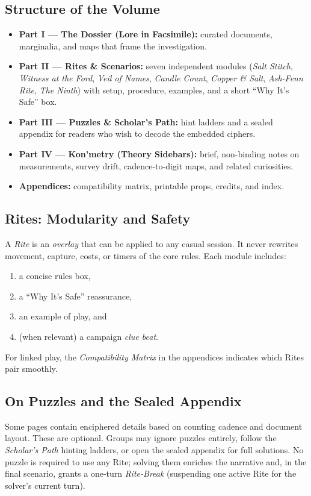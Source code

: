 \documentclass[11pt]{article}
\begin{document}
\subsection*{Structure of the Volume}
\begin{itemize}
  \item \textbf{Part I — The Dossier (Lore in Facsimile):} curated documents, marginalia, and maps that frame the investigation.
  \item \textbf{Part II — Rites \& Scenarios:} seven independent modules (\emph{Salt Stitch}, \emph{Witness at the Ford}, \emph{Veil of Names}, \emph{Candle Count}, \emph{Copper \& Salt}, \emph{Ash-Fenn Rite}, \emph{The Ninth}) with setup, procedure, examples, and a short “Why It’s Safe” box.
  \item \textbf{Part III — Puzzles \& Scholar’s Path:} hint ladders and a sealed appendix for readers who wish to decode the embedded ciphers.
  \item \textbf{Part IV — Kon’metry (Theory Sidebars):} brief, non-binding notes on measurements, survey drift, cadence-to-digit maps, and related curiosities.
  \item \textbf{Appendices:} compatibility matrix, printable props, credits, and index.
\end{itemize}

\subsection*{Rites: Modularity and Safety}
A \emph{Rite} is an \emph{overlay} that can be applied to any casual session. It never rewrites movement, capture, costs, or timers of the core rules. Each module includes:
\begin{enumerate}
  \item a concise rules box, 
  \item a “Why It’s Safe” reassurance, 
  \item an example of play, and 
  \item (when relevant) a campaign \emph{clue beat}.
\end{enumerate}
For linked play, the \emph{Compatibility Matrix} in the appendices indicates which Rites pair smoothly.

\subsection*{On Puzzles and the Sealed Appendix}
Some pages contain enciphered details based on counting cadence and document layout. These are optional. Groups may ignore puzzles entirely, follow the \emph{Scholar’s Path} hinting ladders, or open the sealed appendix for full solutions. No puzzle is required to use any Rite; solving them enriches the narrative and, in the final scenario, grants a one-turn \emph{Rite-Break} (suspending one active Rite for the solver’s current turn).
\end{document}
